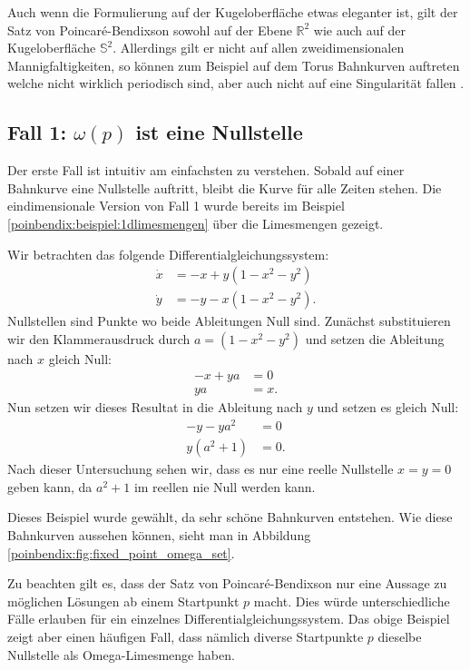 Auch wenn die Formulierung auf der Kugeloberfläche etwas eleganter ist, gilt der Satz von Poincaré-Bendixson sowohl auf der Ebene $\mathbb{R}^2$ wie auch auf der Kugeloberfläche $\mathbb{S}^2$.
Allerdings gilt er nicht auf allen zweidimensionalen Mannigfaltigkeiten, so können zum Beispiel auf dem Torus Bahnkurven auftreten welche nicht wirklich periodisch sind, aber auch nicht auf eine Singularität fallen \cite{poinbendix:wiki}.
%


\subsection{Fall 1: $\omega(p)$ ist eine Nullstelle} \label{poinbendix:subsection:fall1}

Der erste Fall ist intuitiv am einfachsten zu verstehen.
Sobald auf einer Bahnkurve eine Nullstelle auftritt, bleibt die Kurve für alle Zeiten stehen.
Die eindimensionale Version von Fall 1  wurde bereits im Beispiel \ref{poinbendix:beispiel:1dlimesmengen} über die Limesmengen gezeigt.

\begin{beispiel} \label{poinbendix:beispiel:fall1}
Wir betrachten das folgende Differentialgleichungssystem:
\begin{align*}
    \dot{x} &= -x + y(1-x^2-y^2) \\
    \dot{y} &= -y - x(1-x^2-y^2).
\end{align*}
Nullstellen sind Punkte wo beide Ableitungen Null sind.
Zunächst substituieren wir den Klammerausdruck durch $a = (1-x^2-y^2)$ und setzen die Ableitung nach $x$ gleich Null:
\begin{align*}
    -x + ya &= 0 \\
    ya &= x.
\end{align*}
Nun setzen wir dieses Resultat in die Ableitung nach $y$ und setzen es gleich Null:
\begin{align*}
    -y - ya^2 &= 0 \\
    y(a^2+1) &= 0.
\end{align*}
Nach dieser Untersuchung sehen wir, dass es nur eine reelle Nullstelle $x=y=0$ geben kann, da $a^2 + 1$ im reellen nie Null werden kann.

Dieses Beispiel wurde gewählt, da sehr schöne Bahnkurven entstehen.
Wie diese Bahnkurven aussehen können, sieht man in Abbildung \ref{poinbendix:fig:fixed_point_omega_set}.
\end{beispiel}

Zu beachten gilt es, dass der Satz von Poincaré-Bendixson nur eine Aussage zu möglichen Lösungen ab einem Startpunkt $p$ macht.
Dies würde unterschiedliche Fälle erlauben für ein einzelnes Differentialgleichungssystem.
Das obige Beispiel zeigt aber einen häufigen Fall, dass nämlich diverse Startpunkte $p$ dieselbe Nullstelle als Omega-Limesmenge haben.

